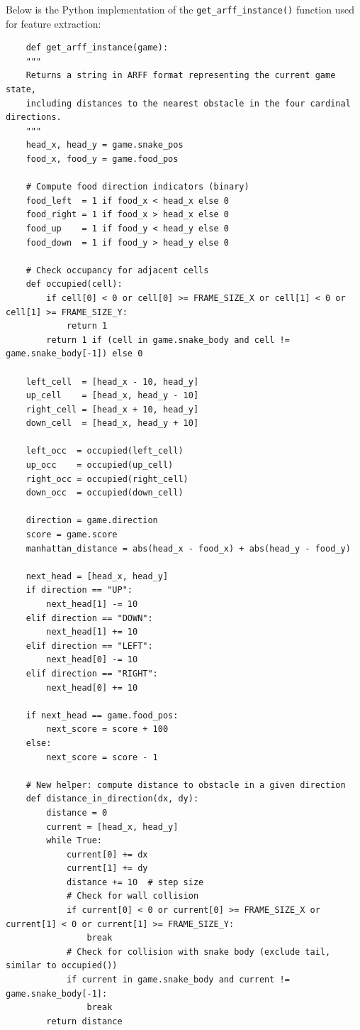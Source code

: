 \documentclass[12pt,a4paper]{article}
\begin{document}
Below is the Python implementation of the \texttt{get\_arff\_instance()} function used for feature extraction:

\begin{verbatim}
    def get_arff_instance(game):
    """
    Returns a string in ARFF format representing the current game state,
    including distances to the nearest obstacle in the four cardinal directions.
    """
    head_x, head_y = game.snake_pos
    food_x, food_y = game.food_pos

    # Compute food direction indicators (binary)
    food_left  = 1 if food_x < head_x else 0
    food_right = 1 if food_x > head_x else 0
    food_up    = 1 if food_y < head_y else 0
    food_down  = 1 if food_y > head_y else 0

    # Check occupancy for adjacent cells
    def occupied(cell):
        if cell[0] < 0 or cell[0] >= FRAME_SIZE_X or cell[1] < 0 or cell[1] >= FRAME_SIZE_Y:
            return 1
        return 1 if (cell in game.snake_body and cell != game.snake_body[-1]) else 0

    left_cell  = [head_x - 10, head_y]
    up_cell    = [head_x, head_y - 10]
    right_cell = [head_x + 10, head_y]
    down_cell  = [head_x, head_y + 10]

    left_occ  = occupied(left_cell)
    up_occ    = occupied(up_cell)
    right_occ = occupied(right_cell)
    down_occ  = occupied(down_cell)

    direction = game.direction
    score = game.score
    manhattan_distance = abs(head_x - food_x) + abs(head_y - food_y)

    next_head = [head_x, head_y]
    if direction == "UP":
        next_head[1] -= 10
    elif direction == "DOWN":
        next_head[1] += 10
    elif direction == "LEFT":
        next_head[0] -= 10
    elif direction == "RIGHT":
        next_head[0] += 10

    if next_head == game.food_pos:
        next_score = score + 100
    else:
        next_score = score - 1

    # New helper: compute distance to obstacle in a given direction
    def distance_in_direction(dx, dy):
        distance = 0
        current = [head_x, head_y]
        while True:
            current[0] += dx
            current[1] += dy
            distance += 10  # step size
            # Check for wall collision
            if current[0] < 0 or current[0] >= FRAME_SIZE_X or current[1] < 0 or current[1] >= FRAME_SIZE_Y:
                break
            # Check for collision with snake body (exclude tail, similar to occupied())
            if current in game.snake_body and current != game.snake_body[-1]:
                break
        return distance


\end{verbatim}
\end{document}

